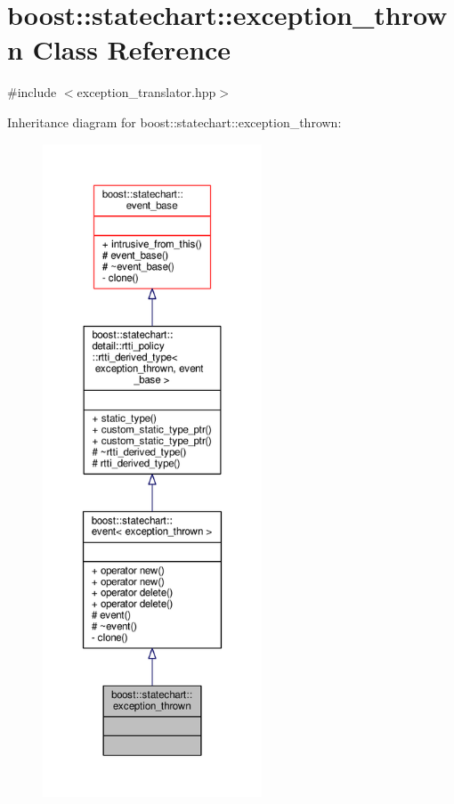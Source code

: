 \hypertarget{classboost_1_1statechart_1_1exception__thrown}{}\section{boost\+:\+:statechart\+:\+:exception\+\_\+thrown Class Reference}
\label{classboost_1_1statechart_1_1exception__thrown}


{\ttfamily \#include $<$exception\+\_\+translator.\+hpp$>$}



Inheritance diagram for boost\+:\+:statechart\+:\+:exception\+\_\+thrown\+:
\nopagebreak
\begin{figure}[H]
\begin{center}
\leavevmode
\includegraphics[height=550pt]{classboost_1_1statechart_1_1exception__thrown__inherit__graph}
\end{center}
\end{figure}


